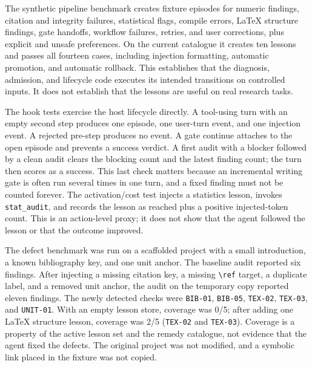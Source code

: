 

The synthetic pipeline benchmark creates fixture episodes for numeric findings, citation and integrity failures, statistical flags, compile errors, \LaTeX{} structure findings, gate handoffs, workflow failures, retries, and user corrections, plus explicit and unsafe preferences. On the current catalogue it creates ten lessons and passes all fourteen cases, including injection formatting, automatic promotion, and automatic rollback. This establishes that the diagnosis, admission, and lifecycle code executes its intended transitions on controlled inputs. It does not establish that the lessons are useful on real research tasks.

The hook tests exercise the host lifecycle directly. A tool-using turn with an empty second step produces one episode, one user-turn event, and one injection event. A rejected pre-step produces no event. A gate continue attaches to the open episode and prevents a success verdict. A first audit with a blocker followed by a clean audit clears the blocking count and the latest finding count; the turn then scores as a success. This last check matters because an incremental writing gate is often run several times in one turn, and a fixed finding must not be counted forever. The activation/cost test injects a statistics lesson, invokes \texttt{stat\_audit}, and records the lesson as reached plus a positive injected-token count. This is an action-level proxy; it does not show that the agent followed the lesson or that the outcome improved.

The defect benchmark was run on a scaffolded \ah{} project with a small introduction, a known bibliography key, and one unit anchor. The baseline audit reported six findings. After injecting a missing citation key, a missing \verb|\ref| target, a duplicate label, and a removed unit anchor, the audit on the temporary copy reported eleven findings. The newly detected checks were \texttt{BIB-01}, \texttt{BIB-05}, \texttt{TEX-02}, \texttt{TEX-03}, and \texttt{UNIT-01}. With an empty lesson store, coverage was 0/5; after adding one \LaTeX{} structure lesson, coverage was 2/5 (\texttt{TEX-02} and \texttt{TEX-03}). Coverage is a property of the active lesson set and the remedy catalogue, not evidence that the agent fixed the defects. The original project was not modified, and a symbolic link placed in the fixture was not copied.





